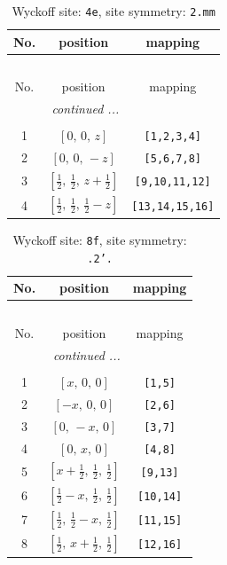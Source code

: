 \documentclass[fleqn,8pt]{jsarticle}
\begin{document}
\renewcommand{\arraystretch}{1.2}
\begin{longtable}{ccc}
\caption{Wyckoff site: {\tt 4e}, site symmetry: {\tt 2.mm}}
 \\
 \hline \hline
No. & position & mapping \\ \hline \endfirsthead

\multicolumn{2}{l}{\tablename\ \thetable{}} \\
 \hline \hline
No. & position & mapping \\ \hline \endhead

 \hline \hline
\multicolumn{2}{r}{\footnotesize\it continued ...} \\ \endfoot

 \hline \hline
\multicolumn{2}{r}{} \\ \endlastfoot

1 & $\left[ 0,\, 0,\, z \right]$ & {\tt [1,2,3,4]} \\ \hline
2 & $\left[ 0,\, 0,\, - z \right]$ & {\tt [5,6,7,8]} \\ \hline
3 & $\left[ \frac{1}{2},\, \frac{1}{2},\, z + \frac{1}{2} \right]$ & {\tt [9,10,11,12]} \\ \hline
4 & $\left[ \frac{1}{2},\, \frac{1}{2},\, \frac{1}{2} - z \right]$ & {\tt [13,14,15,16]} \\
\end{longtable}
\renewcommand{\arraystretch}{1.2}
\begin{longtable}{ccc}
\caption{Wyckoff site: {\tt 8f}, site symmetry: {\tt .2'.}}
 \\
 \hline \hline
No. & position & mapping \\ \hline \endfirsthead

\multicolumn{2}{l}{\tablename\ \thetable{}} \\
 \hline \hline
No. & position & mapping \\ \hline \endhead

 \hline \hline
\multicolumn{2}{r}{\footnotesize\it continued ...} \\ \endfoot

 \hline \hline
\multicolumn{2}{r}{} \\ \endlastfoot

1 & $\left[ x,\, 0,\, 0 \right]$ & {\tt [1,5]} \\ \hline
2 & $\left[ - x,\, 0,\, 0 \right]$ & {\tt [2,6]} \\ \hline
3 & $\left[ 0,\, - x,\, 0 \right]$ & {\tt [3,7]} \\ \hline
4 & $\left[ 0,\, x,\, 0 \right]$ & {\tt [4,8]} \\ \hline
5 & $\left[ x + \frac{1}{2},\, \frac{1}{2},\, \frac{1}{2} \right]$ & {\tt [9,13]} \\ \hline
6 & $\left[ \frac{1}{2} - x,\, \frac{1}{2},\, \frac{1}{2} \right]$ & {\tt [10,14]} \\ \hline
7 & $\left[ \frac{1}{2},\, \frac{1}{2} - x,\, \frac{1}{2} \right]$ & {\tt [11,15]} \\ \hline
8 & $\left[ \frac{1}{2},\, x + \frac{1}{2},\, \frac{1}{2} \right]$ & {\tt [12,16]} \\
\end{longtable}
\end{document}
